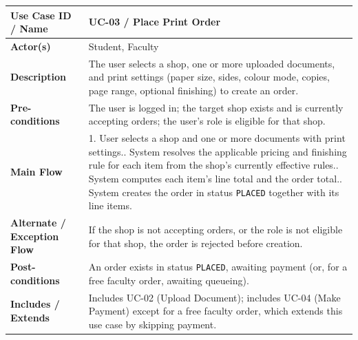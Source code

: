 \documentclass[12pt,a4paper]{report}
\begin{document}
\begin{center}
\begin{longtable}{|p{3.3cm}|p{10.7cm}|}
\textbf{Use Case ID / Name} & UC-03 / Place Print Order \\ \hline
\textbf{Actor(s)} & Student, Faculty \\ \hline
\textbf{Description} & The user selects a shop, one or more uploaded documents, and print settings (paper size, sides, colour mode, copies, page range, optional finishing) to create an order. \\ \hline
\textbf{Pre-conditions} & The user is logged in; the target shop exists and is currently accepting orders; the user's role is eligible for that shop. \\ \hline
\textbf{Main Flow} & 1. User selects a shop and one or more documents with print settings.\newline 2. System resolves the applicable pricing and finishing rule for each item from the shop's currently effective rules.\newline 3. System computes each item's line total and the order total.\newline 4. System creates the order in status \texttt{PLACED} together with its line items. \\ \hline
\textbf{Alternate / Exception Flow} & If the shop is not accepting orders, or the role is not eligible for that shop, the order is rejected before creation. \\ \hline
\textbf{Post-conditions} & An order exists in status \texttt{PLACED}, awaiting payment (or, for a free faculty order, awaiting queueing). \\ \hline
\textbf{Includes / Extends} & Includes UC-02 (Upload Document); includes UC-04 (Make Payment) except for a free faculty order, which extends this use case by skipping payment. \\ \hline


\end{longtable}
\end{center}
\end{document}
